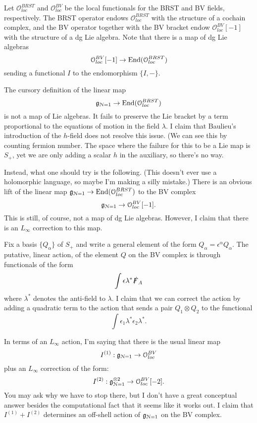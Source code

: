 \documentclass[10pt, oneside]{article}
\begin{document}
\def\oloc{\mathcal{O}_{loc}}

Let $\oloc^{BRST}$ and $\oloc^{BV}$ be the local functionals for the BRST and BV fields, respectively. 
The BRST operator endows $\oloc^{BRST}$ with the structure of a cochain complex, and the BV operator together with the BV bracket endow $\oloc^{BV}[-1]$ with the structure of a dg Lie algebra. 
Note that there is a map of dg Lie algebras
\[
\oloc^{BV}[-1] \to {\rm End}(\oloc^{BRST})
\]
sending a functional $I$ to the endomorphism $\{I,-\}$.

\def\cN{\mathcal{N}}

The cursory definition of the linear map
\[
\mf g_{\cN=1} \to {\rm End}(\oloc^{BRST})
\]
is not a map of Lie algebras. 
It fails to preserve the Lie bracket by a term proportional to the equations of motion in the field $\lambda$. 
I claim that Baulieu's introduction of the $h$-field does not resolve this issue. (We can see this by counting fermion number. 
The space where the failure for this to be a Lie map is $S_+$, yet we are only adding a scalar $h$ in the auxiliary, so there's no way.

Instead, what one should try is the following. 
(This doesn't ever use a holomorphic language, so maybe I'm making a silly mistake.)
There is an obvious lift of the linear map $\mf g_{\cN=1} \to {\rm End}(\oloc^{BRST})$ to the BV complex
\[
\mf g_{\cN=1} \to \oloc^{BV} [-1] .
\]
This is still, of course, not a map of dg Lie algebras.
However, I claim that there is an $L_\infty$ correction to this map. 

Fix a basis $\{Q_\alpha\}$ of $S_+$ and write a general element of the form $Q_{\alpha} = \epsilon^\alpha Q_\alpha$.
The putative, linear action, of the element $Q$ on the BV complex is through functionals of the form
\[
\int \epsilon \lambda^* \slashed{F}_A 
\]
where $\lambda^*$ denotes the anti-field to $\lambda$. 
I claim that we can correct the action by adding a quadratic term to the action that sends a pair $Q_1 \otimes Q_2$ to the functional
\[
\int \epsilon_1 \lambda^* \epsilon_2 \lambda^*  .
\] 

In terms of an $L_\infty$ action, I'm saying that there is the usual linear map
\[
I^{(1)} : \mf g_{\cN=1} \to \oloc^{BV} 
\]
plus an $L_\infty$ correction of the form:
\[
I^{(2)} : \mf g_{\cN=1}^{\otimes 2} \to \oloc^{BV} [-2]  .
\]
You may ask why we have to stop there, but I don't have a great conceptual answer besides the computational fact that it seems like it works out. 
I claim that $I^{(1)} + I^{(2)}$ determines an off-shell action of $\mf g_{\cN=1}$ on the BV complex. 
\end{document}

